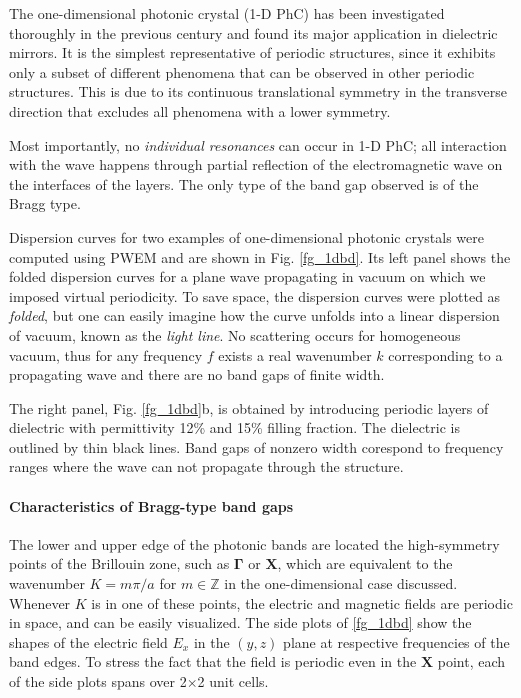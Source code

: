 The one-dimensional photonic crystal (1-D PhC) has been investigated thoroughly in the previous century and found its major application in dielectric mirrors. It is the simplest representative of periodic structures, since  it exhibits only a subset of different phenomena that can be observed in other periodic structures. This is due to its continuous translational symmetry in the transverse direction that excludes all phenomena with a lower symmetry. 

Most importantly, no \textit{individual resonances} can occur in 1-D PhC; all interaction with the wave happens through partial reflection of the electromagnetic wave on the interfaces of the layers. The only type of the band gap observed is of the Bragg type.

Dispersion curves for two examples of one-dimensional photonic crystals were computed using PWEM and are shown in Fig. \ref{fg_1dbd}. 
Its left panel shows the folded dispersion curves for a plane wave propagating in vacuum on which we imposed virtual periodicity. To save space, the dispersion curves were plotted as \textit{folded}, but one can easily imagine how the curve unfolds into a linear dispersion of vacuum, known as the \textit{light line}. No scattering occurs for homogeneous vacuum, thus for any frequency $f$ exists a real wavenumber $k$ corresponding to a propagating wave and there are no band gaps of finite width. 

The right panel, Fig. \ref{fg_1dbd}b, is obtained by introducing periodic layers of dielectric with permittivity 12\% and 15\% filling fraction. The dielectric is outlined by thin black lines. Band gaps of nonzero width corespond to frequency ranges where the wave can not propagate through the structure. %

\paragraph{Characteristics of Bragg-type band gaps}%
The lower and upper edge of the photonic bands are located the high-symmetry points of the Brillouin zone, such as $\mathbf{\Gamma}$ or $\mathbf{X}$, which are equivalent to the wavenumber $K=m\pi/a$ for $m\in\mathbb{Z}$ in the one-dimensional case discussed. Whenever $K$ is in one of these points, the electric and magnetic fields are periodic in space, and can be easily visualized. The side plots of \ref{fg_1dbd} show the shapes of the electric field $E_x$ in the $(y,z)$ plane at respective frequencies of the band edges. To stress the fact that the field is periodic even in the $\mathbf{X}$ point, each of the side plots spans over 2$\times$2 unit cells. 

